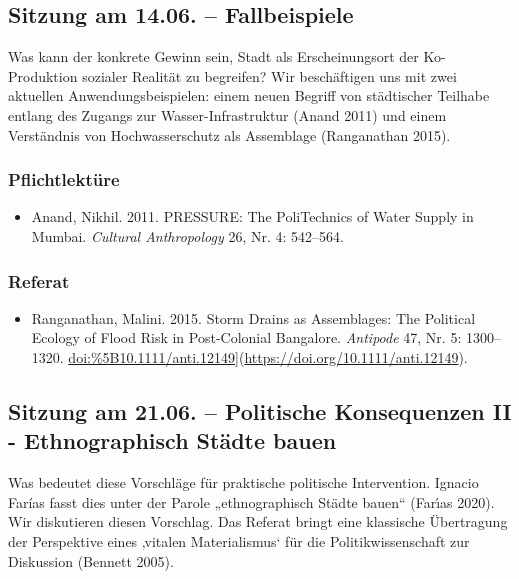 \documentclass[
]{article}
\providecommand{\tightlist}{%
  \setlength{\itemsep}{0pt}\setlength{\parskip}{0pt}}
\begin{document}
\hypertarget{sitzung-am-14.06.-fallbeispiele}{%
\subsection{Sitzung am 14.06. -- Fallbeispiele}\label{sitzung-am-14.06.-fallbeispiele}}

Was kann der konkrete Gewinn sein, Stadt als Erscheinungsort der Ko-Produktion sozialer Realität zu begreifen? Wir beschäftigen uns mit zwei aktuellen Anwendungsbeispielen: einem neuen Begriff von städtischer Teilhabe entlang des Zugangs zur Wasser-Infrastruktur (Anand 2011) und einem Verständnis von Hochwasserschutz als Assemblage (Ranganathan 2015).

\hypertarget{pflichtlektuxfcre-7}{%
\subsubsection*{Pflichtlektüre}\label{pflichtlektuxfcre-7}}

\begin{itemize}
\tightlist
\item
  Anand, Nikhil. 2011. PRESSURE: The PoliTechnics of Water Supply in Mumbai. \emph{Cultural Anthropology} 26, Nr. 4: 542--564.
\end{itemize}

\hypertarget{referat-7}{%
\subsubsection*{Referat}\label{referat-7}}

\begin{itemize}
\tightlist
\item
  Ranganathan, Malini. 2015. Storm Drains as Assemblages: The Political Ecology of Flood Risk in Post-Colonial Bangalore. \emph{Antipode} 47, Nr. 5: 1300--1320. \url{doi:\%5B10.1111/anti.12149}{]}(\url{https://doi.org/10.1111/anti.12149}).
\end{itemize}

\hypertarget{sitzung-am-21.06.-politische-konsequenzen-ii---ethnographisch-stuxe4dte-bauen}{%
\subsection{Sitzung am 21.06. -- Politische Konsequenzen II - Ethnographisch Städte bauen}\label{sitzung-am-21.06.-politische-konsequenzen-ii---ethnographisch-stuxe4dte-bauen}}

Was bedeutet diese Vorschläge für praktische politische Intervention. Ignacio Farías fasst dies unter der Parole „ethnographisch Städte bauen`` (Farı́as 2020). Wir diskutieren diesen Vorschlag. Das Referat bringt eine klassische Übertragung der Perspektive eines ‚vitalen Materialismus` für die Politikwissenschaft zur Diskussion (Bennett 2005).
\end{document}
